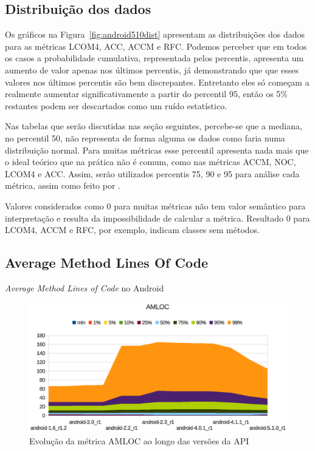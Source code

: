 \subsection{Distribuição dos dados}

Os gráficos na Figura~\ref{fig:android510dist} apresentam as distribuições dos dados para as métricas LCOM4, ACC, ACCM e RFC. Podemos perceber que em todos os casos a probabilidade cumulativa, representada pelos percentis, apresenta um aumento de valor apenas nos últimos percentis, já demonstrando que que esses valores nos últimos percentis são bem discrepantes. Entretanto eles só começam a realmente aumentar significativamente a partir do percentil 95, então os 5\% restantes podem ser descartados como um ruído estatístico. 

Nas tabelas que serão discutidas nas seção seguintes, percebe-se que a mediana, no percentil 50, não representa de forma alguma os dados como faria numa distribuição normal. Para muitas métricas esse percentil apresenta nada mais que o ideal teórico que na prática não é comum, como nas métricas ACCM, NOC, LCOM4 e ACC. Assim, serão utilizados percentis 75, 90 e 95 para análise cada métrica, assim como feito por .

Valores considerados como 0 para muitas métricas não tem valor semântico para interpretação e resulta da impossibilidade de calcular a métrica. Resultado 0 para LCOM4, ACCM e RFC, por exemplo, indicam classes sem métodos.

\subsection{Average Method Lines Of Code}

\begin{table}[!htb]
\centering
{}

\caption{\textit{Average Method Lines of Code} no Android}
\label{tab:amloc_android}
\end{table}

\begin{figure}[!htb]
\centering
\includegraphics [keepaspectratio=true,scale=0.85]{figuras/graphs/amloc_android.eps}
\caption{Evolução da métrica AMLOC ao longo das versões da API}
\label{fig:amloc_android}
\end{figure}

